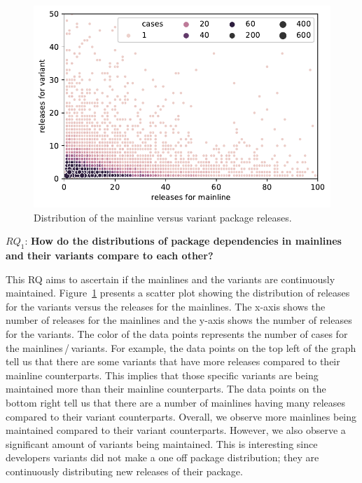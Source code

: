 \begin{figure}[htbp]
\vspace{-.3cm}
   \centering
    \includegraphics[scale=0.6]{figures/benevolj_releases.pdf}
    \caption{Distribution of the mainline versus variant package releases.}
    \label{fig:releases}
\end{figure}


$RQ_1$: \textbf{How do the distributions of package dependencies in mainlines and their variants compare to each other?}

This RQ aims to ascertain if the mainlines and the variants are continuously maintained. 
Figure~\ref{fig:releases} presents a scatter plot showing the distribution of releases for the variants versus the releases for the mainlines. 
The x-axis shows the number of releases for the mainlines and the y-axis shows the number of releases for the variants. 
The color of the data points represents the number of cases for the mainlines\,/\,variants.
For example, the data points on the top left of the graph tell us that there are some variants that have more releases compared to their mainline counterparts. 
This implies that those specific variants are being maintained more than their mainline counterparts.
The data points on the bottom right tell us that there are a number of mainlines having many releases compared to their variant counterparts. 
Overall, we observe more mainlines being maintained compared to their variant counterparts.
However, we also observe a significant amount of variants being maintained. 
This is interesting since developers variants did not make a one off package distribution; they are continuously distributing new releases of their package. 

